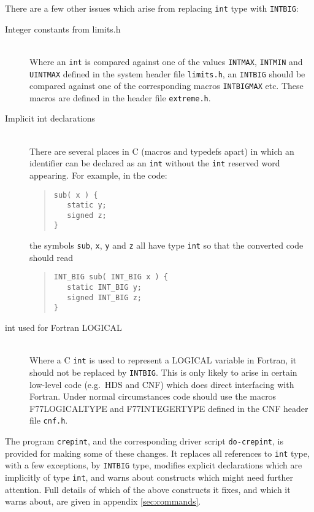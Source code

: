 \documentclass[twoside,11pt]{article}
\newcommand{\htmlref}[2]{#1}
\newcommand{\html}[1]{}
\newcommand{\latexhtml}[2]{#1}
\newcommand{\xref}[3]{#1}
\renewcommand{\_}{\texttt{\symbol{95}}}
\newcommand{\xroutine}[1]{\htmlref{{\tt #1}}{#1}}
\newcommand{\xdofilter}[1]{\htmlref{{\tt do-#1}}{do-xxx}}
\newcommand{\file}[1]{{\tt #1}}
\newcommand{\cc}[1]{{\tt #1}}
\newcommand{\ditem}[1]{\item[#1]\mbox{}\\}
\newenvironment{squote}{\begin{quote}\begin{small}}{\end{small}\end{quote}}
\begin{document}
There are a few other issues which arise from replacing \cc{int} type
with \cc{INT\_BIG}:
\begin{description}
%
\ditem{Integer constants from limits.h}
Where an \cc{int} is compared against one of the values
\cc{INT\_MAX}, \cc{INT\_MIN} and \cc{UINT\_MAX}
defined in the system header file \file{limits.h},
an \cc{INT\_BIG} should be compared against one of the corresponding
macros \cc{INT\_BIG\_MAX} etc.
These macros are defined in the header file \file{extreme.h}.
\html{\begin{squote}\end{squote}}
%
\ditem{Implicit int declarations}
There are several places in C (macros and typedefs apart)
in which an identifier can be declared
as an \cc{int} without the \cc{int} reserved word appearing.
For example, in the code:
\begin{squote}
\begin{verbatim}
sub( x ) {
   static y;
   signed z;
}
\end{verbatim}
\end{squote}
the symbols \cc{sub}, \cc{x}, \cc{y} and \cc{z} all have type \cc{int}
so that the converted code should read
\begin{squote}
\begin{verbatim}
INT_BIG sub( INT_BIG x ) {
   static INT_BIG y;
   signed INT_BIG z;
}
\end{verbatim}
\end{squote}
%
\ditem{int used for Fortran LOGICAL}
Where a C \cc{int} is used to represent a LOGICAL variable in Fortran,
it should not be replaced by \cc{INT\_BIG}.
This is only likely to arise in certain low-level code
(e.g.\ \xref{HDS}{sun92}{} and \xref{CNF}{sun209}{})
which does direct interfacing with Fortran.
Under normal circumstances code should use the macros
F77\_LOGICAL\_TYPE and F77\_INTEGER\_TYPE defined in the
CNF header file \file{cnf.h}.
%
\end{description}

The program \xroutine{crepint}, and the corresponding driver script
\xdofilter{crepint}, is provided for making some of these changes.
It replaces all references to \cc{int} type, with a few exceptions,
by \cc{INT\_BIG} type, modifies explicit declarations which are
implicitly of type \cc{int},
and warns about constructs which might need further attention.
Full details of which of the above constructs it fixes, and which it
warns about, are given in
\latexhtml{appendix \ref{sec:commands}}{\htmlref{the appendix}{crepint}}.
\end{document}
